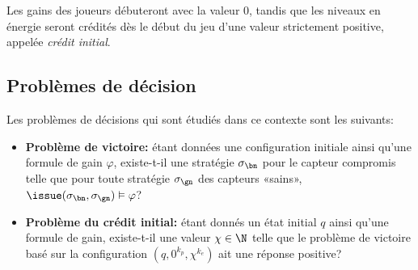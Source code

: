 Les gains des joueurs débuteront avec la valeur $0$, tandis que les niveaux en énergie seront crédités dès le début du jeu d'une valeur strictement positive, appelée \emph{crédit initial}.

\subsection{Problèmes de décision}

Les problèmes de décisions qui sont étudiés dans ce contexte sont les suivants:

\begin{itemize}
    \item \textbf{Problème de victoire:} étant données une configuration initiale ainsi qu'une formule de gain $\varphi$, existe-t-il une stratégie $\sigma_\bn$ pour le capteur compromis telle que pour toute stratégie $\sigma_\gn$ des capteurs «sains», $\issue(\sigma_\bn,\sigma_\gn) \vDash \varphi$?
    \item \textbf{Problème du crédit initial:} étant donnés un état initial $q$ ainsi qu'une formule de gain, existe-t-il une valeur $\chi \in \N$ telle que le problème de victoire basé sur la configuration $(q,0^{k_p},\chi^{k_e})$ ait une réponse positive?
\end{itemize}
